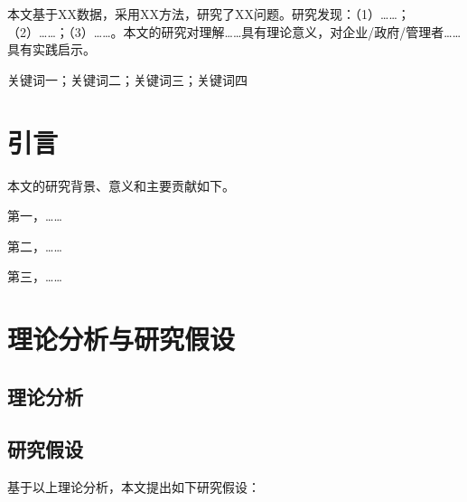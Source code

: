 \documentclass[10pt, UTF8, twocolumn]{ctexart}
\begin{document}




\begin{glsjabstract}
本文基于XX数据，采用XX方法，研究了XX问题。研究发现：（1）……；（2）……；（3）……。本文的研究对理解……具有理论意义，对企业/政府/管理者……具有实践启示。
\end{glsjabstract}

\begin{glsjkeywords}
关键词一；关键词二；关键词三；关键词四
\end{glsjkeywords}


\section{引言}
\label{sec:intro}

本文的研究背景、意义和主要贡献如下。

第一，……

第二，……

第三，……

\section{理论分析与研究假设}
\label{sec:theory}

\subsection{理论分析}

\subsection{研究假设}
基于以上理论分析，本文提出如下研究假设：
\end{document}
